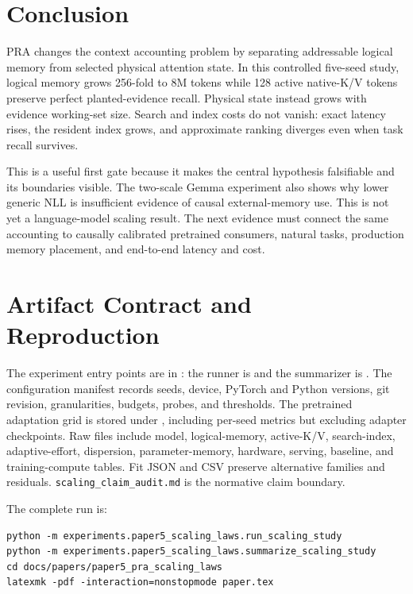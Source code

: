 \documentclass[10pt]{article}
\begin{document}
\section{Conclusion}

PRA changes the context accounting problem by separating addressable logical
memory from selected physical attention state. In this controlled five-seed
study, logical memory grows 256-fold to 8M tokens while 128 active native-K/V
tokens preserve perfect planted-evidence recall. Physical state instead grows
with evidence working-set size. Search and index costs do not vanish: exact
latency rises, the resident index grows, and approximate ranking diverges even
when task recall survives.

This is a useful first gate because it makes the central hypothesis falsifiable
and its boundaries visible. The two-scale Gemma experiment also shows why lower
generic NLL is insufficient evidence of causal external-memory use. This is not
yet a language-model scaling result. The next evidence must connect the same
accounting to causally calibrated pretrained consumers, natural tasks,
production memory placement, and end-to-end latency and cost.

\appendix
\section{Artifact Contract and Reproduction}

The experiment entry points are in
: the runner is
 and the summarizer is
. The configuration manifest records seeds,
device, PyTorch and Python versions, git revision, granularities, budgets, probes,
and thresholds. The pretrained adaptation grid is stored under
, including per-seed metrics but excluding adapter
checkpoints. Raw files include model, logical-memory, active-K/V, search-index,
adaptive-effort, dispersion, parameter-memory, hardware, serving, baseline, and
training-compute tables. Fit JSON and CSV preserve alternative families and
residuals. \texttt{scaling\_claim\_audit.md} is the normative claim boundary.

The complete run is:
\begin{verbatim}
python -m experiments.paper5_scaling_laws.run_scaling_study
python -m experiments.paper5_scaling_laws.summarize_scaling_study
cd docs/papers/paper5_pra_scaling_laws
latexmk -pdf -interaction=nonstopmode paper.tex
\end{verbatim}
\end{document}
